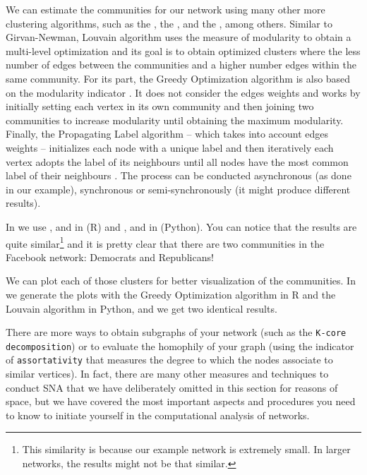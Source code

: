 We can estimate the communities for our network using many other more clustering algorithms, such as the , the , and the , among others. Similar to Girvan-Newman, Louvain algorithm uses the measure of modularity to obtain a multi-level optimization \citep{blondel2008fast} and its goal is to obtain optimized clusters where the less number of edges between the communities and a higher number edges within the same community. For its part, the Greedy Optimization algorithm is also based on the modularity indicator \citep{clauset2004finding}. It does not consider the edges weights and works by initially setting each vertex in its own community and then joining two communities to increase modularity until obtaining the maximum modularity. Finally, the Propagating Label algorithm -- which takes into account edges weights -- initializes each node with a unique label and then iteratively each vertex adopts the label of its neighbours until all nodes have the most common label of their neighbours \citep{raghavan2007near}. The process can be conducted asynchronous (as done in our example), synchronous or semi-synchronously (it might produce different results).

In  we use ,  and  in  (R) and ,  and  in  (Python). You can notice  that the results are quite similar\footnote{This similarity is because our example network is extremely small. In larger networks, the results might not be that similar.}  and it is pretty clear that there are two communities in the Facebook network: Democrats and Republicans!


We can plot each of those clusters for better visualization of the communities. In  we generate the plots with the Greedy Optimization algorithm in R and the Louvain algorithm in Python, and we get two identical results.


There are more ways to obtain subgraphs of your network (such as the \texttt{K-core decomposition}) or to evaluate the homophily of your graph (using the indicator of \texttt{assortativity} that measures the degree to which the nodes associate to similar vertices). In fact, there are many other measures and techniques to conduct SNA that we have deliberately omitted in this section for reasons of space, but we have covered the most important aspects and procedures you need to know to initiate yourself in the computational analysis of networks.

